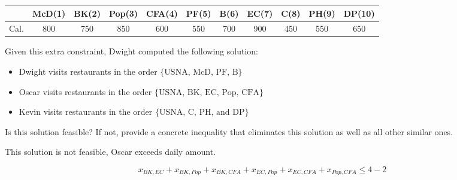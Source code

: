 \documentclass[12pt]{exam}
\begin{document}
\begin{questions}
\begin{parts}
\begin{center}
\begin{tabular}{c|cccccccccc} 
\hline 
 & McD(1) & BK(2) & Pop(3) &  CFA(4) &  PF(5) & B(6) & EC(7) & C(8) & PH(9) & DP(10) \\ \hline
 Cal. & 800 & 750 & 850 & 600 & 550 & 700 & 900 & 450 & 550 & 650 \\
\end{tabular}
\end{center}

Given this extra constraint, Dwight computed the following solution:
\begin{itemize}
    \item  Dwight visits restaurants in the order $\{ \textrm{USNA, McD, PF, B}\}$
    \item Oscar visits restaurants in the order $\{ \textrm{USNA, BK, EC, Pop, CFA}\}$
    \item Kevin visits restaurants in the order $\{ \textrm{USNA, C, PH, and DP}\}$
\end{itemize}


Is this solution feasible? If not, provide a concrete inequality that eliminates this solution as well as all other similar ones.
\end{parts}

\begin{solution}
This solution is not feasible, Oscar exceeds daily amount.

\[
x_{BK,EC}+x_{BK,Pop}+x_{BK,CFA} + x_{EC,Pop}+x_{EC,CFA}+x_{Pop,CFA}  \leq 4-2
\]
\end{solution}

\end{questions}
\end{document}
